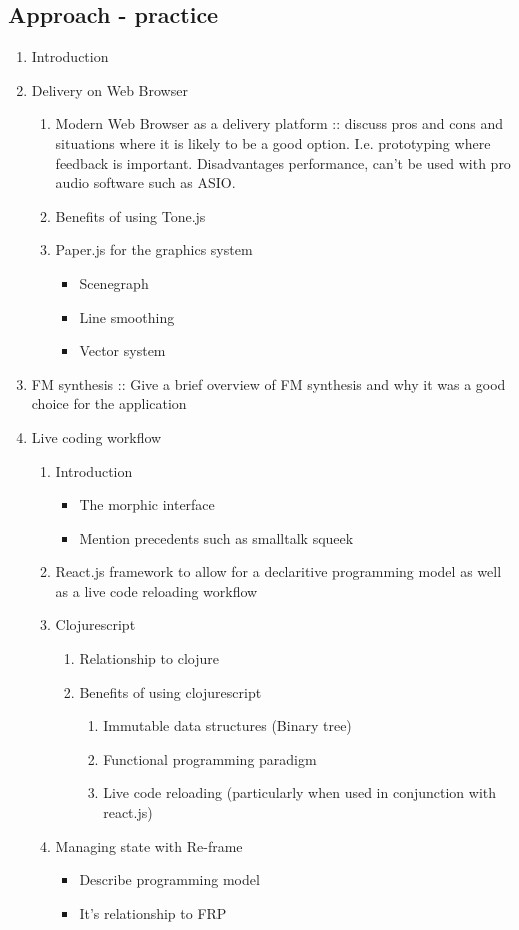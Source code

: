 \documentclass[a4paper,12pt]{article}
\begin{document}
\subsection{Approach - practice}
\label{sec:orgea92578}
\begin{enumerate}
\item Introduction
\item Delivery on Web Browser
\begin{enumerate}
\item Modern Web Browser as a delivery platform :: discuss pros and cons and situations
where it is likely to be a good option. I.e. prototyping where feedback
is important. Disadvantages performance, can't be used with pro audio
software such as ASIO. \cite{adenot_web_2017}
\item Benefits of using Tone.js \cite{mann_interactive_2015}
\item Paper.js for the graphics system
\begin{itemize}
\item Scenegraph
\item Line smoothing
\item Vector system
\end{itemize}
\end{enumerate}
\item FM synthesis :: Give a brief overview of FM synthesis and why it was a
good choice for the application
\item Live coding workflow
\begin{enumerate}
\item Introduction
\begin{itemize}
\item The morphic interface
\item Mention precedents such as smalltalk squeek
\end{itemize}
\item React.js framework to allow for a declaritive programming model as well
as a live code reloading workflow
\item Clojurescript
\begin{enumerate}
\item Relationship to clojure
\item Benefits of using clojurescript
\begin{enumerate}
\item Immutable data structures (Binary tree)
\item Functional programming paradigm
\item Live code reloading (particularly when used in conjunction with
react.js)
\end{enumerate}
\end{enumerate}
\item Managing state with Re-frame
\begin{itemize}
\item Describe programming model
\item It's relationship to FRP
\end{itemize}
\end{enumerate}
\end{enumerate}
\end{document}
